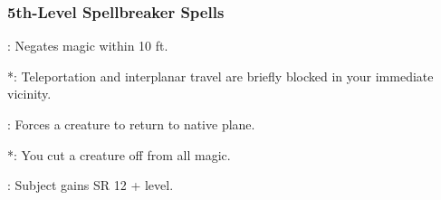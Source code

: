\subsubsection{5th-Level Spellbreaker Spells}
\begin{list}{}{\leftmargin=1em}
  \item {}: Negates magic within 10 ft.
  \item {}*: Teleportation and interplanar travel are briefly blocked in your immediate vicinity.
  \item {}: Forces a creature to return to native plane.
  \item {}*: You cut a creature off from all magic.
  \item {}: Subject gains SR 12 + level.
\end{list}